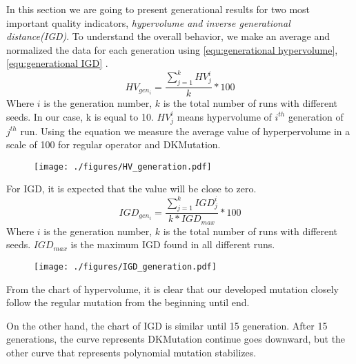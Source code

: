 \documentclass{article}
\begin{document}
In this section we are going to present generational results for two most important quality indicators, \emph{hypervolume and inverse generational distance(IGD)}. 
To understand the overall behavior, we make an average and normalized the data for each generation using \eqref{equ:generational hypervolume}, \eqref{equ:generational IGD} . 
\begin{equation}
\label{equ:generational hypervolume}
HV_{gen_i} = \frac {\sum\limits_{j=1}^k HV_j^i} {k} * 100
\end{equation}
Where $i$ is the generation number, $k$ is the total number of runs with different seeds. In our case, k is equal to 10.
$HV_j^i$ means hypervolume of $i^{th}$ generation of $j^{th}$ run. 
Using the equation we measure the average value of hyperpervolume in a scale of 100 for regular operator and DKMutation.
\begin{figure}
\centering
\label{fig:genetational IGD}
\texttt{[image: ./figures/HV\_generation.pdf]}
\end{figure}


For IGD, it is expected that the value will be close to zero.
\begin{equation}
\label{equ:generational IGD}
IGD_{gen_i} = \frac{\sum\limits_{j=1}^k IGD_j^i}{k*IGD_{max}} *100
\end{equation}
Where $i$ is the generation number, $k$ is the total number of runs with different seeds. 
$IGD_{max}$ is the maximum IGD found in all different runs. 
\begin{figure}
\centering
\label{fig:genetational IGD}
\texttt{[image: ./figures/IGD\_generation.pdf]}
\end{figure}

From the chart of hypervolume, it is clear that our developed mutation closely follow the regular mutation from the beginning until end. 

On the other hand, the chart of IGD is similar until 15 generation. 
After 15 generations, the curve represents DKMutation continue goes downward, but the other curve that represents polynomial mutation stabilizes. 
\end{document}

